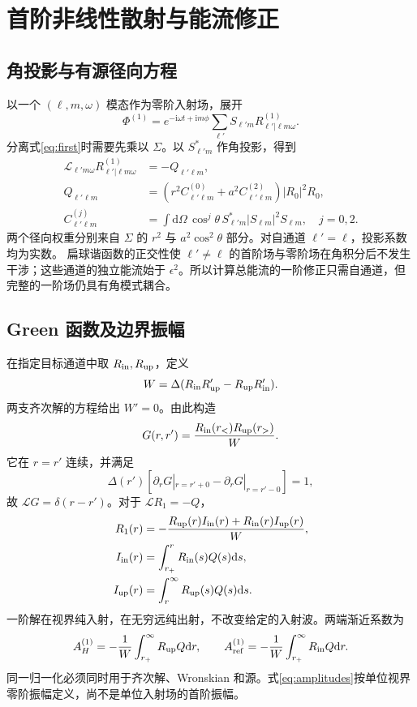 \documentclass[UTF8,fontset=fandol,11pt,a4paper]{ctexart}
\newcommand{\ii}{\mathrm i}
\newcommand{\dd}{\mathrm d}
\newcommand{\AH}{A_H^{(1)}}
\newcommand{\Aref}{A_{\mathrm{ref}}^{(1)}}
\numberwithin{equation}{section}
\begin{document}
\section{首阶非线性散射与能流修正}
\label{sec:nonlinear}
\subsection{角投影与有源径向方程}
以一个 $(\ell,m,\omega)$ 模态作为零阶入射场，展开
\begin{equation}
\Phi^{(1)}=e^{-\ii\omega t+\ii m\phi}\sum_{\ell'}S_{\ell'm}R^{(1)}_{\ell'|\ell m\omega}.
\end{equation}
分离式\eqref{eq:first}时需要先乘以 $\Sigma$。以 $S_{\ell'm}^*$ 作角投影，得到
\begin{align}
\mathcal L_{\ell'm\omega}R^{(1)}_{\ell'|\ell m\omega}&=-Q_{\ell'\ell m},\\
Q_{\ell'\ell m}&=(r^2C^{(0)}_{\ell'\ell m}+a^2C^{(2)}_{\ell'\ell m})|R_0|^2R_0,\label{eq:source}\\
C^{(j)}_{\ell'\ell m}&=\int\dd\Omega\,\cos^j\theta\,S_{\ell'm}^*|S_{\ell m}|^2S_{\ell m},\quad j=0,2.
\end{align}
两个径向权重分别来自 $\Sigma$ 的 $r^2$ 与 $a^2\cos^2\theta$ 部分。对自通道 $\ell'=\ell$，投影系数均为实数。
扁球谐函数的正交性使 $\ell'\ne\ell$ 的首阶场与零阶场在角积分后不发生干涉；这些通道的独立能流始于 $\epsilon^2$。所以计算总能流的一阶修正只需自通道，但完整的一阶场仍具有角模式耦合。

\subsection{Green 函数及边界振幅}
在指定目标通道中取 $R_{\rm in},R_{\rm up}$，定义
\begin{equation}
W=\Delta(R_{\rm in}R_{\rm up}'-R_{\rm up}R_{\rm in}').
\end{equation}
两支齐次解的方程给出 $W'=0$。由此构造
\begin{equation}
G(r,r')=\frac{R_{\rm in}(r_<)R_{\rm up}(r_>)}W.
\end{equation}
它在 $r=r'$ 连续，并满足
\begin{equation}
\Delta(r')[\partial_rG|_{r=r'+0}-\partial_rG|_{r=r'-0}]=1,
\end{equation}
故 $\mathcal LG=\delta(r-r')$。对于 $\mathcal LR_1=-Q$，
\begin{align}
R_1(r)&=-\frac{R_{\rm up}(r)I_{\rm in}(r)+R_{\rm in}(r)I_{\rm up}(r)}W,\label{eq:R1green}\\
I_{\rm in}(r)&=\int_{r_+}^{r}R_{\rm in}(s)Q(s)\dd s,\\
I_{\rm up}(r)&=\int_{r}^{\infty}R_{\rm up}(s)Q(s)\dd s.
\end{align}
一阶解在视界纯入射，在无穷远纯出射，不改变给定的入射波。两端渐近系数为
\begin{equation}
\AH=-\frac1W\int_{r_+}^\infty R_{\rm up}Q\dd r,\qquad
\Aref=-\frac1W\int_{r_+}^\infty R_{\rm in}Q\dd r.\label{eq:amplitudes}
\end{equation}
同一归一化必须同时用于齐次解、Wronskian 和源。式\eqref{eq:amplitudes}按单位视界零阶振幅定义，尚不是单位入射场的首阶振幅。
\end{document}
